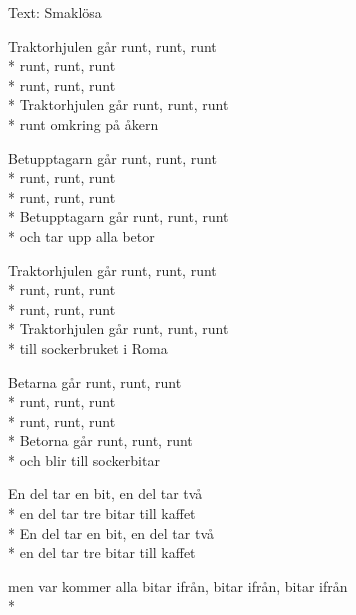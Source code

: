 \begin{SongText}[Traktorhjulen]
    \begin{SongInfo}
        Text: Smaklösa
    \end{SongInfo}
    \begin{SongVerse}
        Traktorhjulen går runt, runt, runt\\*%
        runt, runt, runt\\*%
        runt, runt, runt\\*%
        Traktorhjulen går runt, runt, runt\\*%
        runt omkring på åkern
    \end{SongVerse}
    \begin{SongVerse}
        Betupptagarn går runt, runt, runt\\*%
        runt, runt, runt\\*%
        runt, runt, runt\\*%
        Betupptagarn går runt, runt, runt\\*%
        och tar upp alla betor
    \end{SongVerse}
    \begin{SongVerse}
        Traktorhjulen går runt, runt, runt\\*%
        runt, runt, runt\\*%
        runt, runt, runt\\*%
        Traktorhjulen går runt, runt, runt\\*%
        till sockerbruket i Roma
    \end{SongVerse}
    \begin{SongVerse}
        Betarna går runt, runt, runt\\*%
        runt, runt, runt\\*%
        runt, runt, runt\\*%
        Betorna går runt, runt, runt\\*%
        och blir till sockerbitar
    \end{SongVerse}
    \begin{SongVerse}
        En del tar en bit, en del tar två\\*%
        en del tar tre bitar till kaffet\\*%
        En del tar en bit, en del tar två\\*%
        en del tar tre bitar till kaffet
    \end{SongVerse}
    \begin{SongVerse}
        men var kommer alla bitar ifrån, bitar ifrån, bitar ifrån\\*%

\end{SongVerse}
\end{SongText}
